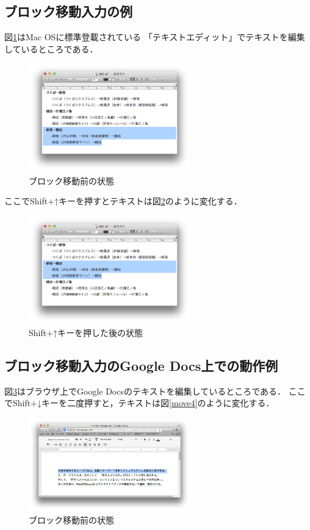 \subsection{ブロック移動入力の例}
図\ref{move1}はMac OSに標準登載されている
「テキストエディット」でテキストを編集しているところである．

\begin{figure}[H]
\centerline{\includegraphics[width=70mm,bb=0 0 703 472]{figures/block2.png}}
\caption{ブロック移動前の状態}
\label{move1}
\end{figure}

ここでShift+↑キーを押すとテキストは図\ref{move2}のように変化する．

\begin{figure}[H]
\centerline{\includegraphics[width=70mm,bb=0 0 703 472]{figures/block3.png}}
\caption{Shift+↑キーを押した後の状態}
\label{move2}
\end{figure}

\subsection{ブロック移動入力のGoogle Docs上での動作例}

図\ref{move3}はブラウザ上でGoogle Docsのテキストを編集しているところである．
ここでShift+↓キーを二度押すと，テキストは図\ref{move4}のように変化する．

\begin{figure}[H]
\centerline{\includegraphics[width=70mm,bb=0 0 935 542]{figures/block4.png}}
\caption{ブロック移動前の状態}
\label{move3}
\end{figure}

